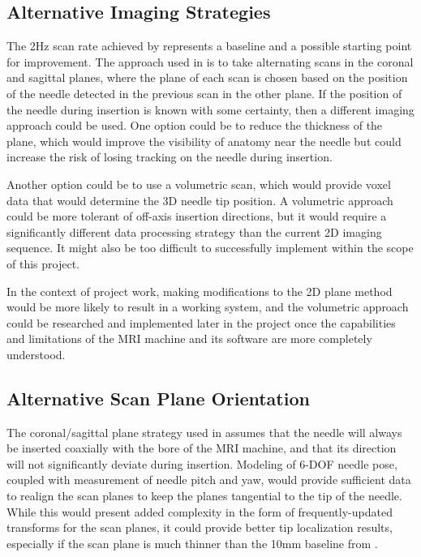 \subsection{Alternative Imaging Strategies}
The 2Hz scan rate achieved by \cite{AIMNeedleSteering} represents a baseline and a possible starting point for improvement. The approach used in \cite{AIMNeedleSteering} is to take alternating scans in the coronal and sagittal planes, where the plane of each scan is chosen based on the position of the needle detected in the previous scan in the other plane.  If the position of the needle during insertion is known with some certainty, then a different imaging approach could be used. One option could be to reduce the thickness of the plane, which would improve the visibility of anatomy near the needle but could increase the risk of losing tracking on the needle during insertion.

Another option could be to use a volumetric scan, which would provide voxel data that would determine the 3D needle tip position. A volumetric approach could be more tolerant of off-axis insertion directions, but it would require a significantly different data processing strategy than the current 2D imaging sequence. It might also be too difficult to successfully implement within the scope of this project.

In the context of project work, making modifications to the 2D plane method would be more likely to result in a working system, and the volumetric approach could be researched and implemented later in the project once the capabilities and limitations of the MRI machine and its software are more completely understood.

\subsection{Alternative Scan Plane Orientation}
The coronal/sagittal plane strategy used in \cite{AIMNeedleSteering} assumes that the needle will always be inserted coaxially with the bore of the MRI machine, and that its direction will not significantly deviate during insertion. Modeling of 6-DOF needle pose, coupled with measurement of needle pitch and yaw, would provide sufficient data to realign the scan planes to keep the planes tangential to the tip of the needle. While this would present added complexity in the form of frequently-updated transforms for the scan planes, it could provide better tip localization results, especially if the scan plane is much thinner than the 10mm baseline from \cite{AIMNeedleSteering}.


